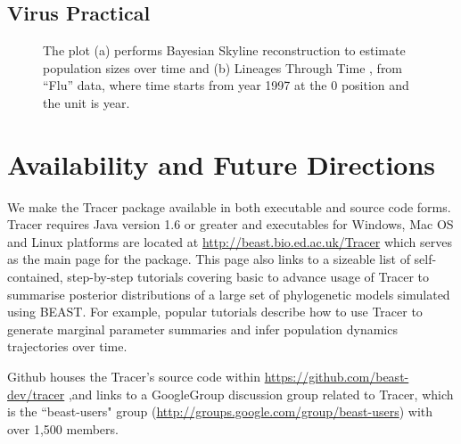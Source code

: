 \documentclass{bioinfo}
\begin{document}
\subsection*{Virus Practical}



\begin{figure}[ht]
\caption{The plot (a) performs Bayesian Skyline reconstruction to estimate population sizes over time and (b) Lineages Through Time , from ``Flu'' data, where time starts from year 1997 at the 0 position and the unit is year.}
\label{fig:flu}
\end{figure}







\section*{Availability and Future Directions}

We make the Tracer package available in both executable and source code forms.  Tracer requires Java version 1.6 or greater and executables for Windows, Mac OS and Linux platforms are located at \url{http://beast.bio.ed.ac.uk/Tracer} %
which serves as the main page for the package. This page also links to a sizeable list of self-contained, step-by-step tutorials covering basic to advance usage of Tracer to summarise posterior distributions of a large set of phylogenetic models simulated using BEAST.  For example, popular tutorials describe how to use Tracer to generate marginal parameter summaries and infer population dynamics trajectories over time.

Github houses the Tracer's source code within \url{https://github.com/beast-dev/tracer} ,and links to a GoogleGroup discussion group related to Tracer,  
which is the ``beast-users" group (\url{http://groups.google.com/group/beast-users}) with over 1,500 members. 
\end{document}
